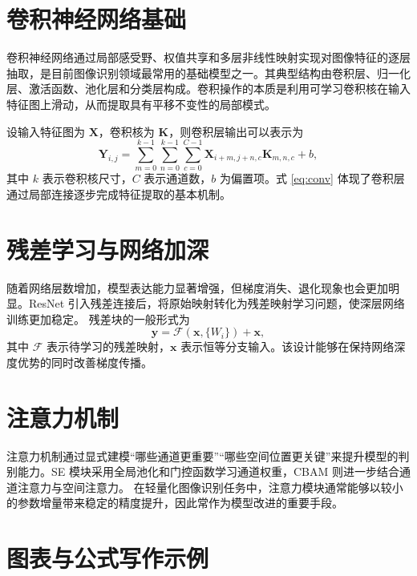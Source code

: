 \section{卷积神经网络基础}

卷积神经网络通过局部感受野、权值共享和多层非线性映射实现对图像特征的逐层抽取，是目前图像识别领域最常用的基础模型之一。其典型结构由卷积层、归一化层、激活函数、池化层和分类层构成。卷积操作的本质是利用可学习卷积核在输入特征图上滑动，从而提取具有平移不变性的局部模式。

设输入特征图为 $\mathbf{X}$，卷积核为 $\mathbf{K}$，则卷积层输出可以表示为
\begin{equation}
  \mathbf{Y}_{i,j}=\sum_{m=0}^{k-1}\sum_{n=0}^{k-1}\sum_{c=0}^{C-1}\mathbf{X}_{i+m,j+n,c}\mathbf{K}_{m,n,c}+b,
  \label{eq:conv}
\end{equation}
其中 $k$ 表示卷积核尺寸，$C$ 表示通道数，$b$ 为偏置项。式 \eqref{eq:conv} 体现了卷积层通过局部连接逐步完成特征提取的基本机制。

\section{残差学习与网络加深}

随着网络层数增加，模型表达能力显著增强，但梯度消失、退化现象也会更加明显。ResNet 引入残差连接后，将原始映射转化为残差映射学习问题，使深层网络训练更加稳定。\supercite{he2016deep} 残差块的一般形式为
\begin{equation}
  \mathbf{y}=\mathcal{F}(\mathbf{x},\{W_i\})+\mathbf{x},
  \label{eq:residual}
\end{equation}
其中 $\mathcal{F}$ 表示待学习的残差映射，$\mathbf{x}$ 表示恒等分支输入。该设计能够在保持网络深度优势的同时改善梯度传播。

\section{注意力机制}

注意力机制通过显式建模“哪些通道更重要”“哪些空间位置更关键”来提升模型的判别能力。SE 模块采用全局池化和门控函数学习通道权重，CBAM 则进一步结合通道注意力与空间注意力。\supercite{hu2018senet,woo2018cbam} 在轻量化图像识别任务中，注意力模块通常能够以较小的参数增量带来稳定的精度提升，因此常作为模型改进的重要手段。

\section{图表与公式写作示例}

